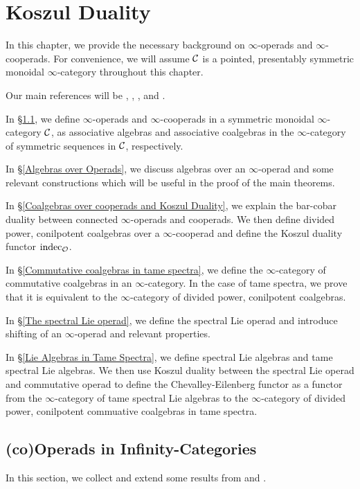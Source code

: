 \chapter{Koszul Duality}

In this chapter, we provide the necessary background on $\infty$-operads and $\infty$-cooperads. For convenience, we will assume ${\mathcal{C}}$ is a pointed, presentably symmetric monoidal $\infty$-category throughout this chapter.

Our main references will be \cite{BrantnerPhD},  \cite{Heuts_Koszul}, \cite{Francis-Gaitsgory}, \cite{Hadrianphdthesis} and \cite{HA}.
 
In \S \ref{(co)Operads in Infinity-Categories}, we define $\infty$-operads and $\infty$-cooperads in a symmetric monoidal $\infty$-category ${\mathcal{C}}$, as associative algebras and associative coalgebras in the $\infty$-category of symmetric sequences in ${\mathcal{C}}$, respectively.

In \S \ref{Algebras over Operads}, we discuss algebras over an $\infty$-operad and some relevant constructions which will be useful in the proof of the main theorems. 

In \S \ref{Coalgebras over cooperads and Koszul Duality}, we explain the bar-cobar duality between connected $\infty$-operads and cooperads. We then define divided power, conilpotent coalgebras over a $\infty$-cooperad and define the Koszul duality functor $\operatorname{indec}_{{\mathcal{O}}}$.

In \S \ref{Commutative coalgebras in tame spectra}, we define the $\infty$-category of commutative coalgebras in an $\infty$-category. In the case of tame spectra, we prove that it is equivalent to the $\infty$-category of divided power, conilpotent coalgebras.

In \S \ref{The spectral Lie operad}, we define the spectral Lie operad and introduce shifting of an $\infty$-operad and relevant properties.

In \S \ref{Lie Algebras in Tame Spectra}, we define spectral Lie algebras and tame spectral Lie algebras. We then use Koszul duality between the spectral Lie operad and commutative operad to define the Chevalley-Eilenberg functor as a functor from the $\infty$-category of tame spectral Lie algebras to the $\infty$-category of divided power, conilpotent commuative coalgebras in tame spectra.




\section{(co)Operads in Infinity-Categories}
\label{(co)Operads in Infinity-Categories}
In this section, we collect and extend some results from \cite{BrantnerPhD} and \cite{Hadrianphdthesis}.

